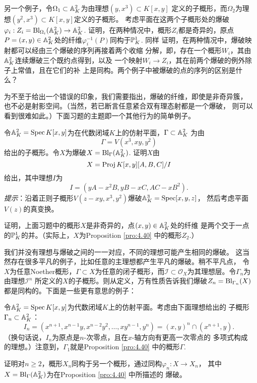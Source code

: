 \begin{exe}\label{exe:4.42}
	另一个例子，令$\Omega_1\subset \A_K^2$为由理想$(y,x^3)\subset K[x,y]$
	定义的子概形，而$\Omega_2$为理想$(y^2,x^3)\subset K[x,y]$定义的子概形。
	考虑平面在这两个子概形处的爆破$\varphi_i:Z_i=\Bl_{\Omega_i}(\A_K^2)
	\to \A_K^2$. 证明，在两种情况中，概形$Z_i$都是奇异的，原点
	$P=(x,y)\in \A_K^2$处的纤维$\varphi_i^{-1}(P)$同构于$\P_K^1$. 同样
	证明，在两种情况中，爆破映射都可以经由三个爆破的序列再接着两个收缩
	分解，即，存在一个概形$W_i$，其由$\A_K^2$连续爆破三个既约点得到，以及
	一个映射$W_i\to Z_i$，其在前两个爆破的例外除子上常值，且在它们的补
	上是同构。两个例子中被爆破的点的序列的区别是什么？
\end{exe}

为不至于给出一个错误的印象，我们需要指出，爆破的纤维，即使是非奇异簇，
也不必是射影空间。（当然，若已断言任意紧合双有理态射都是一个爆破，
则可以看到很难如此。）下面习题的主题即一个其他行为的简单例子。

\begin{exe}\label{exe:4.43}
令$\A_K^2=\spec K[x,y]$为在代数闭域$K$上的仿射平面，$\Gamma\subset \A_K^2$
为由
\[
	\Gamma=V(x^3,xy,y^2)
\]
给出的子概形。令$X$为爆破$X=\Bl_\Gamma(\A_K^2)$. 证明$X$由
\[
	X=\proj K[x,y][A,B,C]/I
\]
给出，其中理想$I$为
\[
	I=(yA-x^2B,yB-xC,AC-xB^2).
\]
\emph{提示}：沿着正则子概形$V(z-xy,x^3,y^2)$爆破$\A_K^3=\spec [x,y,z]$，
然后考虑平面$V(z)$的真变换。
\end{exe}

\begin{exe}\label{exe:4.44}
	证明，上面习题中的概形$X$是非奇异的，点$(x,y)\in\A_K^2$处的纤维
	是两个交于一点的$\P_K^1$的并。（实际上，$X$为Proposition 
	\ref{pro:4.40} 中的概形$Z_2$.）
\end{exe}

我们并没有理想与爆破之间的一一对应，不同的理想可能产生相同的爆破。
这当然存在很多平凡的例子，比如任意的主理想都产生平凡的爆破。稍不平凡点，
令$X$为任意Noether概形，$\Gamma\subset X$为任意的闭子概形，而$\mathscr I
\subset \mathscr O_X$为其理想层。令$\Gamma_n$为由理想$\mathscr I^n$
所定义的$X$的子概形。则从定义，万有性质告诉我们爆破$Z_n=\Bl_{\Gamma_n}(X)$
都是同构的。下面是一些更有意思的例子：


\begin{exe}\label{exe:4.45}
令$\A_K^2=\spec K[x,y]$为代数闭域$K$上的仿射平面。考虑由下面理想给出的
子概形$\Gamma_n\subset \A_K^2$：
	\[
	I_n=(x^{n+1},x^{n-1}y,x^{n-2}y^2,\dots,xy^{n-1},y^n)=
	(x,y)^n\cap (x^{n+1},y).
\]
（换句话说，$I_n$为原点是$n$-次零点，且在$x$-轴方向有更高一次零点的
多项式构成的理想。）注意到，$\Gamma_1$就是Proposition \ref{pro:4.40}
中的概形$\Gamma$.

证明对$n\geq 2$，概形$X_n$同构于另一个概形，通过同构$\varphi_n:X\to X_n$，
其中$X=\Bl_{\Gamma}(\A_K^2)$为在Proposition \ref{pro:4.40} 中所描述的
爆破。
\end{exe}

